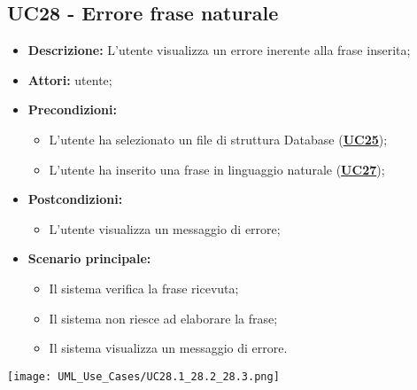 \subsection{UC28 - Errore frase naturale}
\label{sec:UC28}
\begin{itemize}
	\item \textbf{Descrizione:} L’utente visualizza un errore inerente alla frase inserita;
	\item \textbf{Attori:} utente;
	\item \textbf{Precondizioni:} 
	\begin{itemize}
		\item L’utente ha selezionato un file di struttura Database (\hyperref[sec:UC25]{\textbf{UC25}});
		\item L'utente ha inserito una frase in linguaggio naturale (\hyperref[sec:UC27]{\textbf{UC27}});
	\end{itemize}
	\item \textbf{Postcondizioni:} 
	\begin{itemize}
		\item L’utente visualizza un messaggio di errore;
	\end{itemize}
	\item \textbf{Scenario principale:} 
	\begin{itemize}
		\item Il sistema verifica la frase ricevuta;
		\item Il sistema non riesce ad elaborare la frase;
		\item Il sistema visualizza un messaggio di errore.
	\end{itemize}
\end{itemize}

\texttt{[image: UML\_Use\_Cases/UC28.1\_28.2\_28.3.png]}


